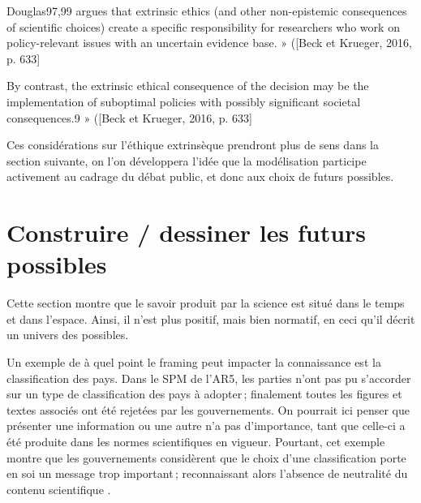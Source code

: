 \begin{displayquote}
    Douglas97,99 argues that extrinsic ethics (and other non-epistemic consequences of scientific choices) create a specific responsibility for researchers who work on policy-relevant issues with an uncertain evidence base. » ([Beck et Krueger, 2016, p. 633]
\end{displayquote}
\begin{displayquote}
     By contrast, the extrinsic ethical consequence of the decision may be the implementation of suboptimal policies with possibly significant societal consequences.9 » ([Beck et Krueger, 2016, p. 633]
\end{displayquote}
 Ces considérations sur l'éthique extrinsèque prendront plus de sens dans la section suivante, on l'on développera l'idée que la modélisation participe activement au cadrage du débat public, et donc aux choix de futurs possibles. 

\section{Construire / dessiner les futurs possibles}

Cette section montre que le savoir produit par la science est situé dans le temps et dans l'espace. Ainsi, il n'est plus positif, mais bien normatif, en ceci qu'il décrit un univers des possibles. 

Un exemple de à quel point le framing peut impacter la connaissance est la classification des pays. Dans le SPM de l'AR5, les parties n'ont pas pu s'accorder sur un type de classification des pays à adopter ; finalement toutes les figures et textes associés ont été rejetées par les gouvernements. On pourrait ici penser que présenter une information ou une autre n'a pas d'importance, tant que celle-ci a été produite dans les normes scientifiques en vigueur. Pourtant, cet exemple montre que les gouvernements considèrent que le choix d'une classification porte en soi un message trop important ; reconnaissant alors l'absence de neutralité du contenu scientifique \cite{edenhofer_mapmakers_2014}. 

